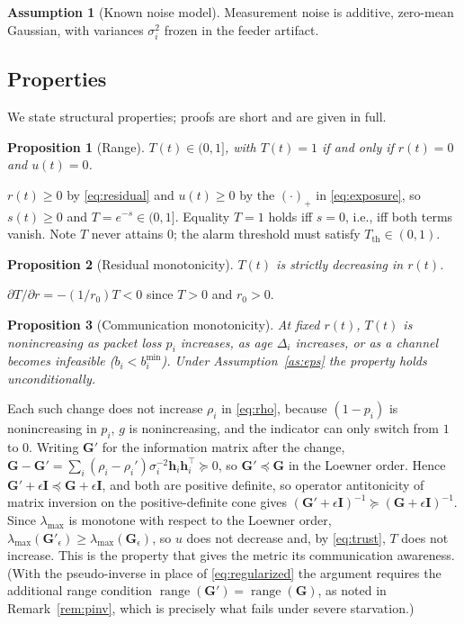 \documentclass[journal]{IEEEtran}
\theoremstyle{plain}
\newtheorem{proposition}{Proposition}
\theoremstyle{definition}
\newtheorem{assumption}{Assumption}
\theoremstyle{remark}
\newcommand{\bh}{\mathbf{h}}
\newcommand{\bG}{\mathbf{G}}
\newcommand{\bI}{\mathbf{I}}
\newcommand{\lmax}{\lambda_{\max}}
\begin{document}
\begin{assumption}[Known noise model]
\label{as:noise}
Measurement noise is additive, zero-mean Gaussian, with variances
$\sigma_i^{2}$ frozen in the feeder artifact.
\end{assumption}

\subsection{Properties}
We state structural properties; proofs are short and are given in full.

\begin{proposition}[Range]
\label{prop:range}
$T(t)\in(0,1]$, with $T(t)=1$ if and only if $r(t)=0$ and $u(t)=0$.
\end{proposition}
\begin{IEEEproof}
$r(t)\ge0$ by \eqref{eq:residual} and $u(t)\ge0$ by the $(\cdot)_{+}$
in \eqref{eq:exposure}, so $s(t)\ge0$ and $T=e^{-s}\in(0,1]$. Equality
$T=1$ holds iff $s=0$, i.e., iff both terms vanish. Note $T$ never
attains $0$; the alarm threshold must satisfy
$T_{\mathrm{th}}\in(0,1)$.
\end{IEEEproof}

\begin{proposition}[Residual monotonicity]
\label{prop:resmono}
$T(t)$ is strictly decreasing in $r(t)$.
\end{proposition}
\begin{IEEEproof}
$\partial T/\partial r=-(1/r_0)T<0$ since $T>0$ and $r_0>0$.
\end{IEEEproof}

\begin{proposition}[Communication monotonicity]
\label{prop:commmono}
At fixed $r(t)$, $T(t)$ is nonincreasing as packet loss $p_i$ increases,
as age $\Delta_i$ increases, or as a channel becomes infeasible
($b_i<b_i^{\min}$). Under Assumption~\ref{as:eps} the property holds
unconditionally.
\end{proposition}
\begin{IEEEproof}
Each such change does not increase $\rho_i$ in \eqref{eq:rho}, because
$(1-p_i)$ is nonincreasing in $p_i$, $g$ is nonincreasing, and the
indicator can only switch from $1$ to $0$. Writing $\bG'$ for the
information matrix after the change, $\bG-\bG'=\sum_i(\rho_i-\rho_i')
\sigma_i^{-2}\bh_i\bh_i^{\top}\succeq0$, so $\bG'\preceq\bG$ in the
Loewner order. Hence $\bG'+\epsilon\bI\preceq\bG+\epsilon\bI$, and both
are positive definite, so operator antitonicity of matrix inversion on the
positive-definite cone gives
$(\bG'+\epsilon\bI)^{-1}\succeq(\bG+\epsilon\bI)^{-1}$. Since $\lmax$ is
monotone with respect to the Loewner order,
$\lmax(\bG'_{\epsilon})\ge\lmax(\bG_{\epsilon})$, so $u$ does not decrease
and, by \eqref{eq:trust}, $T$ does not increase. This is the property that
gives the metric its communication awareness. (With the pseudo-inverse in
place of \eqref{eq:regularized} the argument requires the additional
range condition $\operatorname{range}(\bG')=\operatorname{range}(\bG)$, as
noted in Remark~\ref{rem:pinv}, which is precisely what fails under severe
starvation.)
\end{IEEEproof}
\end{document}
